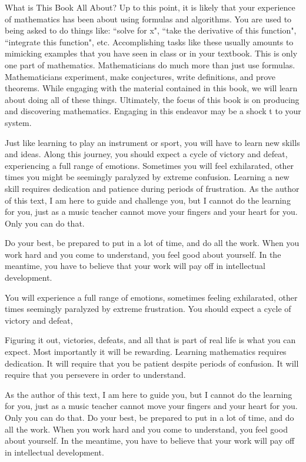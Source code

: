 \begin{section}{What is This Book All About?}
Up to this point, it is likely that your experience of mathematics has been about using formulas and algorithms. You are used to being asked to do things like: ``solve for x", ``take the derivative of this function", ``integrate this function", etc. Accomplishing tasks like these usually amounts to mimicking examples that you have seen in class or in your textbook. This is only one part of mathematics. Mathematicians do much more than just use formulas.  Mathematicians experiment, make conjectures, write definitions, and prove theorems.  While engaging with the material contained in this book, we will learn about doing all of these things. Ultimately, the focus of this book is on producing and discovering mathematics. Engaging in this endeavor may be a shock t to your system.

Just like learning to play an instrument or sport, you will have to learn new skills and ideas. Along this journey, you should expect a cycle of victory and defeat, experiencing a full range of emotions.  Sometimes you will feel exhilarated, other times you might be seemingly paralyzed by extreme confusion. Learning a new skill requires dedication and patience during periods of frustration. As the author of this text, I am here to guide and challenge you, but I cannot do the learning for you, just as a music teacher cannot move your fingers and your heart for you.  Only you can do that.  

Do your best, be prepared to put in a lot of time, and do all the work. When you work hard and you come to understand, you feel good about yourself.  In the meantime, you have to believe that your work will pay off in intellectual development.




You will experience a full range of emotions, sometimes feeling  exhilarated, other times seemingly paralyzed by extreme frustration.  You should expect a cycle of victory and defeat, 

Figuring it out, victories, defeats, and all that is part of real life is what you can expect.  Most importantly it will be rewarding.  Learning mathematics requires dedication.  It will require that you be patient despite periods of confusion.  It will require that you persevere in order to understand.  

As the author of this text, I am here to guide you, but I cannot do the learning for you, just as a music teacher cannot move your fingers and your heart for you.  Only you can do that.  Do your best, be prepared to put in a lot of time, and do all the work. When you work hard and you come to understand, you feel good about yourself.  In the meantime, you have to believe that your work will pay off in intellectual development.


\end{section}
